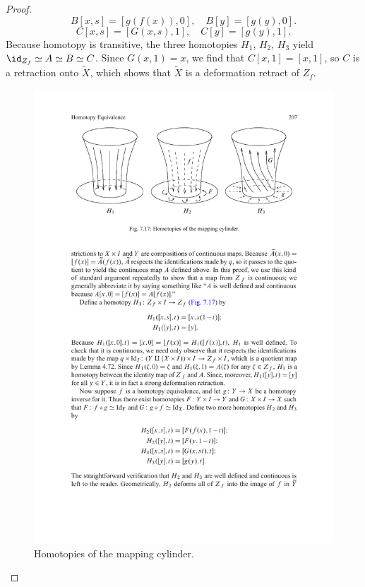 \begin{proof}
\[B[x,s]=[g(f(x)),0],\quad B[y]=[g(y),0].\]
\[C[x,s]=[G(x,s),1],\quad C[y]=[g(y),1].\]
Because homotopy is transitive, the three homotopies $H_1$, $H_2$, $H_3$ yield $\id_{Z_f}\simeq A\simeq B\simeq C$. Since $G(x,1)=x$, we find that $C[x,1]=[x,1]$, so $C$ is a retraction onto $\widetilde{X}$, which shows that $\widetilde{X}$ is a deformation retract of $Z_f$.
\begin{figure}[htbp]
\centering
\includegraphics{pictures/retraction}
\caption{Homotopies of the mapping cylinder.}
\end{figure}
\end{proof}
